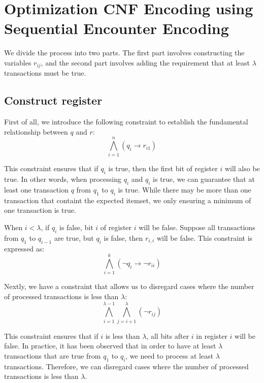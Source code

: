 \section{Optimization CNF Encoding using Sequential Encounter Encoding}

We divide the process into two parts. The first part involves constructing the variables $r_{ij}$,
and the second part involves adding the requirement that at least $\lambda$ transactions must be true.
\subsection{Construct register}

First of all, we introduce the following constraint to establish the fundamental relationship between $q$ and $r$:
\begin{equation}
    \label{eq:at_least_one_bit_true_when_q_i_true}
    \bigwedge_{i=1}^{n} \left( q_i \rightarrow r_{i1} \right)
\end{equation}

This constraint ensures that if $q_i$ is true, then the first bit of register $i$ will also be true. In other words, when processing $q_i$ and $q_i$ is true,
we can guarantee that at least one transaction $q$ from $q_1$ to $q_i$ is true.
While there may be more than one transaction that containt the expected itemset, we only ensuring a minimum of one transaction is true.

When $i < \lambda$, if $q_i$ is false, bit $i$ of register $i$ will be false.
Suppose all transactions from $q_1$ to $q_{i-1}$ are true, but $q_i$ is false, then $r_{i,i}$ will be false.
This constraint is expressed as:
\begin{equation}
    \label{eq:bit_i_of_register_i_false_when_q_i_false}
    \bigwedge_{i=1}^{k} \left( \neg q_i \rightarrow \neg r_{ii} \right)
\end{equation}


Nextly, we have a constraint that allows us to disregard cases where the number of processed transactions is less than $\lambda$:
\begin{equation}
    \label{eq:disregard_when_i_less_than_lambda}
    \bigwedge_{i=1}^{\lambda-1} \bigwedge_{j=i+1}^{\lambda} \left( \neg r_{ij} \right)
\end{equation}

This constraint ensures that if $i$ is less than $\lambda$, all bits after $i$ in register $i$ will be false.
In practice, it has been observed that in order to have at least $\lambda$ transactions that are true from $q_1$ to $q_i$,
we need to process at least $\lambda$ transactions.
Therefore, we can disregard cases where the number of processed transactions is less than $\lambda$.

